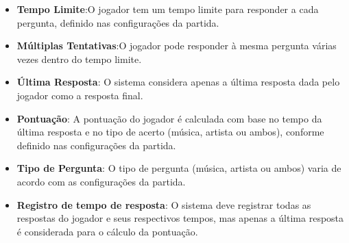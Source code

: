     \begin{itemize}
        \item \textbf{Tempo Limite}:O jogador tem um tempo limite para responder a cada pergunta, definido nas configurações da partida.
        \item \textbf{Múltiplas Tentativas}:O jogador pode responder à mesma pergunta várias vezes dentro do tempo limite.
        \item \textbf{Última Resposta}: O sistema considera apenas a última resposta dada pelo jogador como a resposta final.
        \item \textbf{Pontuação}: A pontuação do jogador é calculada com base no tempo da última resposta e no tipo de acerto (música, artista ou ambos), conforme definido nas configurações da partida.
        \item \textbf{Tipo de Pergunta}: O tipo de pergunta (música, artista ou ambos) varia de acordo com as configurações da partida.
        \item \textbf{Registro de tempo de resposta}: O sistema deve registrar todas as respostas do jogador e seus respectivos tempos, mas apenas a última resposta é considerada para o cálculo da pontuação.
    \end{itemize}